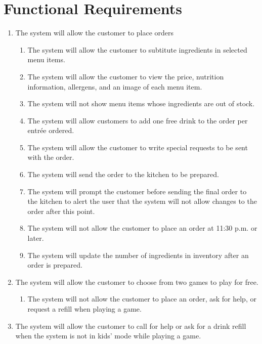 \documentclass[12pt]{article}
\begin{document}
	\section{Functional Requirements}
		\begin{enumerate}
			\item The system will allow the customer to place orders
			\begin{enumerate}
				\item The system will allow the customer to subtitute ingredients in selected menu items.
				\item The system will allow the customer to view the price, nutrition information, allergens, and an image of each menu item.
				\item The system will not show menu items whose ingredients are out of stock.
				\item The system will allow customers to add one free drink to the order per entrée ordered.
				\item The system will allow the customer to write special requests to be sent with the order.
				\item The system will send the order to the kitchen to be prepared.
				\item The system will prompt the customer before sending the final order to the kitchen to alert the user that the system will not allow changes to the order after this point.
				\item The system will not allow the customer to place an order at 11:30 p.m. or later.
				\item The system will update the number of ingredients in inventory after an order is prepared.
			\end{enumerate}

			\item The system will allow the customer to choose from two games to play for free.
				\begin{enumerate}
					\item The system will not allow the customer to place an order, ask for help, or request a refill when playing a game.
				\end{enumerate}

			\item The system will allow the customer to call for help or ask for a drink refill when the system is not in kids' mode while playing a game.


\end{enumerate}
\end{document}
